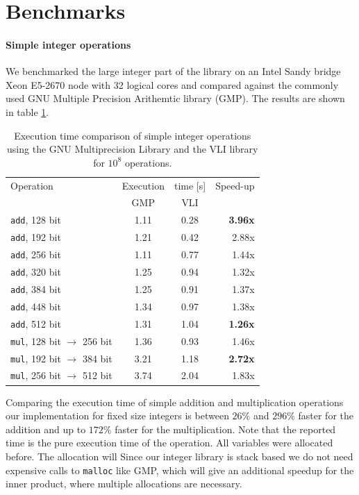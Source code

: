 \documentclass[oribibl,a4paper]{llncs2e/llncs}
\begin{document}
\section{Benchmarks}
\paragraph{Simple integer operations}
We benchmarked the large integer part of the library on an Intel Sandy bridge Xeon E5-2670 node with 32 logical cores
and compared against the commonly used GNU Multiple Precision Arithemtic library (GMP).
The results are shown in table \ref{tab:vli_vs_gmp}.
\begin{table}
   \centering
   \begin{tabular}{l|cc|r}
    Operation & Execution & time [s] & Speed-up\\
      & GMP & VLI & \\
    \hline
   \verb|add|, 128 bit & 1.11 & 0.28 & {\bf 3.96x} \\
   \verb|add|, 192 bit & 1.21 & 0.42 & 2.88x \\
   \verb|add|, 256 bit & 1.11 & 0.77 & 1.44x \\
   \verb|add|, 320 bit & 1.25 & 0.94 & 1.32x \\
   \verb|add|, 384 bit & 1.25 & 0.91 & 1.37x \\
   \verb|add|, 448 bit & 1.34 & 0.97 & 1.38x \\
   \verb|add|, 512 bit & 1.31 & 1.04 & {\bf 1.26x} \\
   \hline
   \verb|mul|, 128 bit $\rightarrow$ 256 bit & 1.36 & 0.93 & 1.46x \\
   \verb|mul|, 192 bit $\rightarrow$ 384 bit & 3.21 & 1.18 & {\bf 2.72x} \\
   \verb|mul|, 256 bit $\rightarrow$ 512 bit & 3.74 & 2.04 & 1.83x \\ 
   \end{tabular}
   \caption{Execution time comparison of simple integer operations using the GNU Multiprecision Library and the VLI library for $10^8$ operations.}
   \label{tab:vli_vs_gmp}
\end{table}
Comparing the execution time of simple addition and multiplication operations our implementation for fixed size integers is between $26\%$ and $296\%$ faster for the addition and up to $172\%$ faster for the multiplication.
Note that the reported time is the pure execution time of the operation. All variables were allocated before.
The allocation will 
Since our integer library is stack based we do not need expensive calls to \verb|malloc| like GMP, which will give an additional speedup for the inner product, where multiple allocations are necessary.
\end{document}
